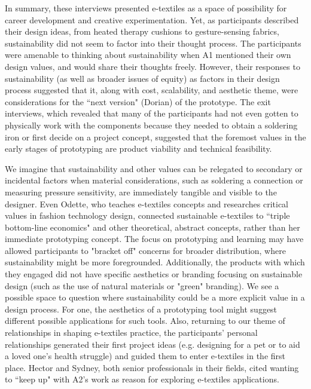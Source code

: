In summary, these interviews presented e-textiles as a space of possibility for career development and creative experimentation. Yet, as participants described their design ideas, from heated therapy cushions to gesture-sensing fabrics, sustainability did not seem to factor into their thought process. The participants were amenable to thinking about sustainability when A1 mentioned their own design values, and would share their thoughts freely. However, their responses to sustainability (as well as broader issues of equity) as factors in their design process suggested that it, along with cost, scalability, and aesthetic theme, were considerations for the ``next version" (Dorian) of the prototype. The exit interviews, which revealed that many of the participants had not even gotten to physically work with the components because they needed to obtain a soldering iron or first decide on a project concept, suggested that the foremost values in the early stages of prototyping are product viability and technical feasibility. 

We imagine that sustainability and other values can be relegated to secondary or incidental factors when material considerations, such as soldering a connection or measuring pressure sensitivity, are immediately tangible and visible to the designer. Even Odette, who teaches e-textiles concepts and researches critical values in fashion technology design, connected sustainable e-textiles to ``triple bottom-line economics" and other theoretical, abstract concepts, rather than her immediate prototyping concept. The focus on prototyping and learning may have allowed participants to "bracket off" concerns for broader distribution, where sustainability might be more foregrounded. Additionally, the products with which they engaged did not have specific aesthetics or branding focusing on sustainable design (such as the use of natural materials or "green" branding). We see a possible space to question where sustainability could be a more explicit value in a design process. For one, the aesthetics of a prototyping tool might suggest different possible applications for such tools. Also, returning to our theme of relationships in shaping e-textiles practice, the participants' personal relationships generated their first project ideas (e.g. designing for a pet or to aid a loved one's health struggle) and guided them to enter e-textiles in the first place. Hector and Sydney, both senior professionals in their fields, cited wanting to ``keep up" with A2's work as reason for exploring e-textiles applications.

